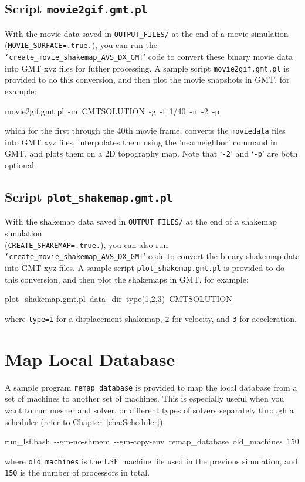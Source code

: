 \subsection{Script \texttt{movie2gif.gmt.pl}}

With the movie data saved in \texttt{OUTPUT\_FILES/} at the end of
a movie simulation (\texttt{\small MOVIE\_SURFACE=.true.}{\small ),
you can run the }\texttt{\small `create\_movie\_shakemap\_AVS\_DX\_GMT}{\small '
code to convert these binary movie data into GMT xyz files for futher
processing. A sample script }\texttt{\small movie2gif.gmt.pl}{\small{}
is provided to do this conversion, and then plot the movie snapshots
in GMT, for example:}{\small \par}
\begin{lyxcode}
movie2gif.gmt.pl~-m~CMTSOLUTION~-g~-f~1/40~-n~-2~-p~
\end{lyxcode}
which for the first through the 40th movie frame, converts the \texttt{moviedata}
files into GMT xyz files, interpolates them using the 'nearneighbor'
command in GMT, and plots them on a 2D topography map. Note that `\texttt{-2}'
and `\texttt{-p}' are both optional.


\subsection{Script \texttt{plot\_shakemap.gmt.pl}}

With the shakemap data saved in \texttt{OUTPUT\_FILES/} at the end
of a shakemap simulation ~\\
 (\texttt{CREATE\_SHAKEMAP=.true.}), you can also run \texttt{`create\_movie\_shakemap\_AVS\_DX\_GMT}'
code to convert the binary shakemap data into GMT xyz files. A sample
script \texttt{plot\_shakemap.gmt.pl} is provided to do this conversion,
and then plot the shakemaps in GMT, for example:
\begin{lyxcode}
plot\_shakemap.gmt.pl~data\_dir~type(1,2,3)~CMTSOLUTION~
\end{lyxcode}
where \texttt{type=1} for a displacement shakemap, \texttt{2} for
velocity, and \texttt{3} for acceleration.


\section{Map Local Database}

A sample program \texttt{remap\_database} is provided to map the local
database from a set of machines to another set of machines. This is
especially useful when you want to run mesher and solver, or different
types of solvers separately through a scheduler (refer to Chapter~\ref{cha:Scheduler}).
\begin{lyxcode}
run\_lsf.bash~-{}-gm-no-shmem~-{}-gm-copy-env~remap\_database~old\_machines~150
\end{lyxcode}
where \texttt{old\_machines} is the LSF machine file used in the previous
simulation, and \texttt{150} is the number of processors in total.


